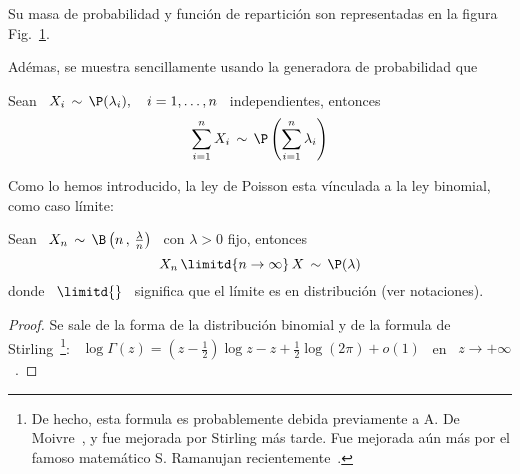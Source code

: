 
Su masa  de probabilidad  y funci\'on de  repartici\'on son representadas  en la
figura Fig.~\ref{Fig:MP:Poisson}.
%
\begin{figure}[h!]
\begin{center}  \end{center}
%
\label{Fig:MP:Poisson}
\end{figure}


Ad\'emas, se muestra  sencillamente usando la generadora de  probabilidad que
%
\begin{lema}[Stabilidad]
\label{Lem:MP:StabilidadPoisson}
%
  Sean  \  $X_i  \,  \sim  \,  \P(\lambda_i),  \quad  i  =  1,  \ldots  ,  n$  \
  independientes, entonces
  \[
  \sum_{i=1}^n X_i \, \sim \, \P\left( \sum_{i=1}^n \lambda_i \right)
  \]
\end{lema}


Como lo hemos introducido, la ley de Poisson esta v\'inculada a la ley binomial, como caso l\'imite:
%
\begin{lema}
\label{Lem:MP:VinvuloPoissonBinomial}
%
  Sean  \  $X_n  \,  \sim  \,  \B\left( n \, , \, \frac{\lambda}{n} \right)$  \
  con $\lambda > 0$ fijo, entonces
  \[
  X_n \, \limitd{n \to \infty} \, X \, \sim \, \P(\lambda)
  \]
  donde  \ $\limitd{}$ \  significa que  el l\'imite  es en  distribuci\'on (ver
  notaciones).
\end{lema}
\begin{proof}
  Se  sale  de la  forma  de  la distribuci\'on  binomial  y  de  la formula  de
  Stirling~\footnote{De hecho, esta  formula es probablemente debida previamente
    a  A.  De  Moivre~\cite{Moi33, Moi56,  Pea24,  Cam86, Dut91,  Dem33}, y  fue
    mejorada por  Stirling m\'as tarde. Fue  mejorada a\'un m\'as  por el famoso
    matem\'atico                          S.                           Ramanujan
    recientemente~\cite[\S~4.1]{AndBer13}.\label{Foot:MP:Stirling}}:            \
  $\log\Gamma(z) = \left( z - \frac12 \right) \log z - z + \frac12 \log(2 \pi) +
  o(1)$ \ en \ $z \to +\infty$~\cite{Sti30, AbrSte70, GraRyz15}.
\end{proof}


